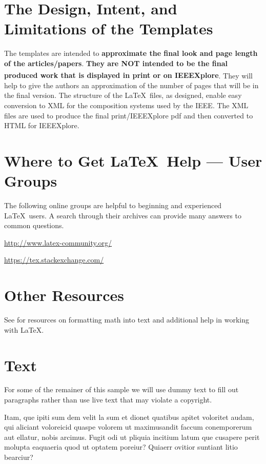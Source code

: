 \documentclass[lettersize,journal]{IEEEtran}
\begin{document}
\section{The Design, Intent, and \\ Limitations of the Templates}
The templates are intended to {\bf{approximate the final look and page length of the articles/papers}}. {\bf{They are NOT intended to be the final produced work that is displayed in print or on IEEEXplore\textsuperscript{\textregistered}}}. They will help to give the authors an approximation of the number of pages that will be in the final version. The structure of the \LaTeX\ files, as designed, enable easy conversion to XML for the composition systems used by the IEEE. The XML files are used to produce the final print/IEEEXplore pdf and then converted to HTML for IEEEXplore.

\section{Where to Get \LaTeX \ Help --- User Groups}
The following online groups are helpful to beginning and experienced \LaTeX\ users. A search through their archives can provide many answers to common questions.
\begin{list}{}{}
\item{\url{http://www.latex-community.org/}} 
\item{\url{https://tex.stackexchange.com/} }
\end{list}

\section{Other Resources}
See \cite{ref1,ref2,ref3,ref4,ref5} for resources on formatting math into text and additional help in working with \LaTeX .

\section{Text}
For some of the remainer of this sample we will use dummy text to fill out paragraphs rather than use live text that may violate a copyright.

Itam, que ipiti sum dem velit la sum et dionet quatibus apitet voloritet audam, qui aliciant voloreicid quaspe volorem ut maximusandit faccum conemporerum aut ellatur, nobis arcimus.
Fugit odi ut pliquia incitium latum que cusapere perit molupta eaquaeria quod ut optatem poreiur? Quiaerr ovitior suntiant litio bearciur?
\end{document}
